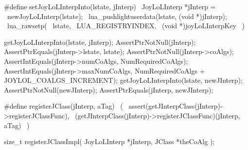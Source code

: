 \startCHeader
#define setJoyLoLInterpInto(lstate, jInterp)      \
  JoyLoLInterp *jInterp =                         \
    newJoyLoLInterp(lstate);                      \
  lua_pushlightuserdata(lstate, (void *)jInterp); \
  lua_rawsetp(                                    \
    lstate,                                       \
    LUA_REGISTRYINDEX,                            \
    (void *)joyLoLInterpKey                       \
  )
\stopCHeader
\setCHeaderStream{public}


\startCTest
  getJoyLoLInterpInto(lstate, jInterp);
  AssertPtrNotNull(jInterp);
  AssertPtrEquals(jInterp->lstate, lstate);
  AssertPtrNotNull(jInterp->coAlgs);
  AssertIntEquals(jInterp->numCoAlgs, NumRequiredCoAlgs);
  AssertIntEquals(jInterp->maxNumCoAlgs,
    NumRequiredCoAlgs + JOYLOL_COALGS_INCREMENT);
  getJoyLoLInterpInto(lstate, newJInterp);
  AssertPtrNotNull(newJInterp);
  AssertPtrEquals(jInterp, newJInterp);
\stopCTest
\stopTestCase
\stopTestSuite

\startTestSuite[registerCoAlgebra]

\startCHeader
#define registerJClass(jInterp, aTag)                              \
  (                                                                    \
    assert(getJInterpClass(jInterp)->registerJClassFunc),          \
    (getJInterpClass(jInterp)->registerJClassFunc)(jInterp, aTag)  \
  )
\stopCHeader

\startCHeader
size_t registerJClassImpl(
  JoyLoLInterp *jInterp,
  JClass       *theCoAlg
);
\stopCHeader
\setCHeaderStream{public}

